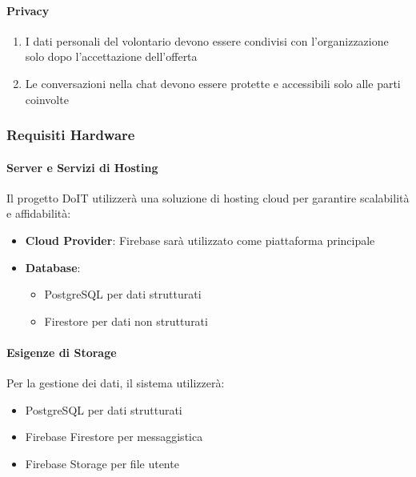 \paragraph{Privacy}

\begin{enumerate}
    \item I dati personali del volontario devono essere condivisi con l'organizzazione solo dopo l'accettazione dell'offerta
    \item Le conversazioni nella chat devono essere protette e accessibili solo alle parti coinvolte
\end{enumerate}

\subsubsection{Requisiti Hardware}

\paragraph{Server e Servizi di Hosting}

Il progetto DoIT utilizzerà una soluzione di hosting cloud per garantire scalabilità e affidabilità:

\begin{itemize}
    \item \textbf{Cloud Provider}: Firebase sarà utilizzato come piattaforma principale
    \item \textbf{Database}:
    \begin{itemize}
        \item PostgreSQL per dati strutturati
        \item Firestore per dati non strutturati
    \end{itemize}
\end{itemize}

\paragraph{Esigenze di Storage}

Per la gestione dei dati, il sistema utilizzerà:

\begin{itemize}
    \item PostgreSQL per dati strutturati
    \item Firebase Firestore per messaggistica
    \item Firebase Storage per file utente
\end{itemize}

